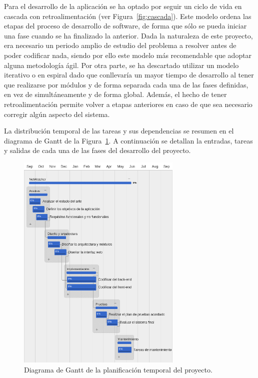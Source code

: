 Para el desarrollo de la aplicación se ha optado por seguir un ciclo de vida en cascada con retroalimentación (ver Figura~\ref{fig:cascada}).
Este modelo ordena las etapas del proceso de desarrollo de software, de forma que sólo se pueda iniciar una fase cuando se ha finalizado la anterior.
Dada la naturaleza de este proyecto, era necesario un periodo amplio de estudio del problema a resolver antes de poder codificar nada, siendo por ello este modelo más recomendable que adoptar alguna metodología ágil.
Por otra parte, se ha descartado utilizar un modelo iterativo o en espiral dado que conllevaría un mayor tiempo de desarrollo al tener que realizarse por módulos y de forma separada cada una de las fases definidas, en vez de simultáneamente y de forma global.
Además, el hecho de tener retroalimentación permite volver a etapas anteriores en caso de que sea necesario corregir algún aspecto del sistema.

La distribución temporal de las tareas y sus dependencias se resumen en el diagrama de Gantt de la Figura~\ref{fig:gantt}.
A continuación se detallan la entradas, tareas y salidas de cada una de las fases del desarrollo del proyecto.

\begin{figure}[!htp]
  \centering
  \includegraphics[width=0.7\textwidth,clip=true]{graphics/gantt_white}
  \caption{Diagrama de Gantt de la planificación temporal del proyecto.}
  \label{fig:gantt}
\end{figure} 

